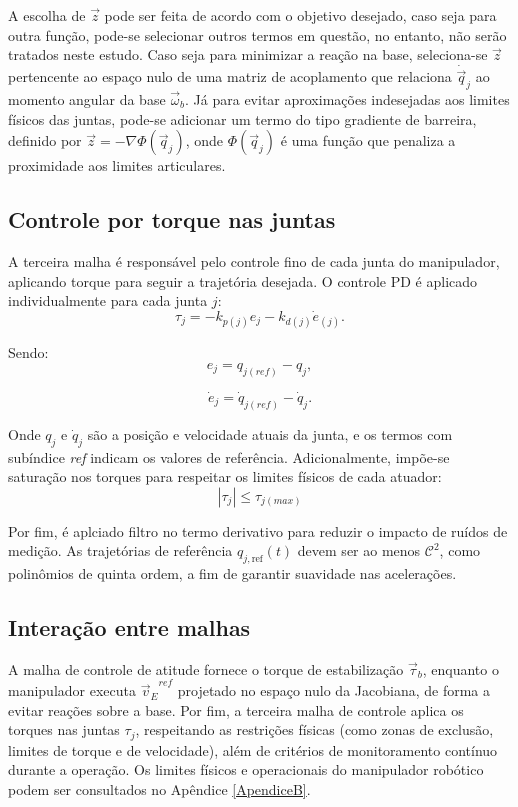 A escolha de $ \vec{z} $ pode ser feita de acordo com o objetivo desejado, caso seja para outra função, pode-se selecionar outros termos em questão, no entanto, não serão tratados neste estudo.
Caso seja para minimizar a reação na base, seleciona-se $ \vec{z} $ pertencente ao espaço nulo de uma matriz de acoplamento que relaciona $ \dot{\vec{q}}_j $ ao momento angular da base $ \vec{\omega}_b $.
Já para evitar aproximações indesejadas aos limites físicos das juntas, pode-se adicionar um termo do tipo gradiente de barreira, definido por $ \vec{z} = -\nabla \Phi(\vec{q}_j) $, onde $ \Phi(\vec{q}_j) $ é uma função que penaliza a proximidade aos limites articulares.

\subsection{Controle por torque nas juntas}
A terceira malha é responsável pelo controle fino de cada junta do manipulador, aplicando torque para seguir a trajetória desejada. O controle PD é aplicado individualmente para cada junta $ j $:
\begin{equation}
\tau_j = -k_{p(j)} e_j - k_{d(j)} \dot{e}_(j).
\label{eq:controle_PD_junta}
\end{equation}

Sendo:
\begin{equation}
e_j = q_{j(ref)} - q_j,
\label{eq:erro_PD_junta1}
\end{equation}

\begin{equation}
\dot{e}_j = \dot{q}_{j(ref)} - \dot{q}_j.
\label{eq:erro_PD_junta2}
\end{equation}

Onde $ q_j $ e $ \dot{q}_j $ são a posição e velocidade atuais da junta, e os termos com subíndice \emph{ref} indicam os valores de referência.
Adicionalmente, impõe-se saturação nos torques para respeitar os limites físicos de cada atuador:
\begin{equation}
|\tau_j| \leq \tau_{j(max)}
\label{eq:saturacao_torque_junta}
\end{equation}

Por fim, é aplciado filtro no termo derivativo para reduzir o impacto de ruídos de medição. As trajetórias de referência $ q_{j,\text{ref}}(t) $ devem ser ao menos $ \mathcal{C}^2 $, como polinômios de quinta ordem, a fim de garantir suavidade nas acelerações.

\subsection{Interação entre malhas}
A malha de controle de atitude fornece o torque de estabilização $ \vec{\tau}_b $, enquanto o manipulador executa $ {\vec{v}_E}^{ref} $ projetado no espaço nulo da Jacobiana, de forma a evitar reações sobre a base.
Por fim, a terceira malha de controle aplica os torques nas juntas $ \tau_j $, respeitando as restrições físicas (como zonas de exclusão, limites de torque e de velocidade), além de critérios de monitoramento contínuo durante a operação.
Os limites físicos e operacionais do manipulador robótico podem ser consultados no Apêndice \ref{ApendiceB}.

